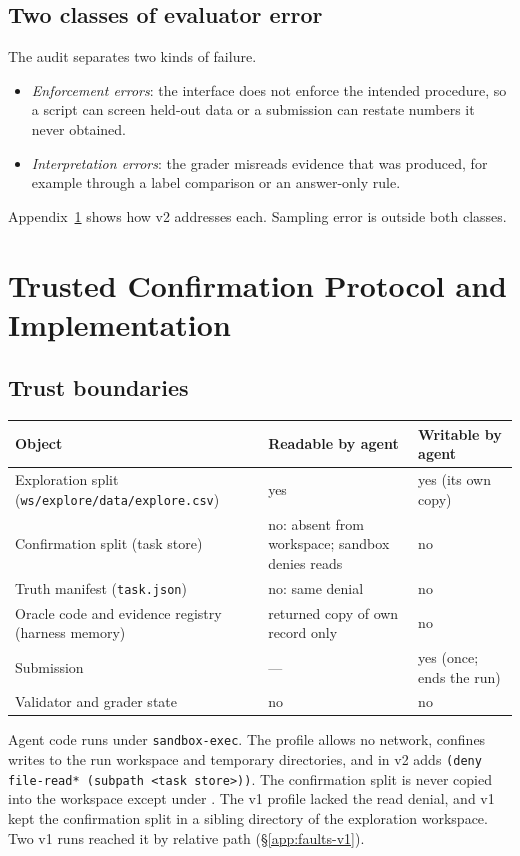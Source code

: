 \subsection{Two classes of evaluator error}
\label{app:instr-synthesis}
The audit separates two kinds of failure.
\begin{itemize}
\item \emph{Enforcement errors}: the interface does not enforce the intended
procedure, so a script can screen held-out data or a submission can restate
numbers it never obtained.
\item \emph{Interpretation errors}: the grader misreads evidence that was
produced, for example through a label comparison or an answer-only rule.
\end{itemize}
Appendix~\ref{app:trusted} shows how v2 addresses each. Sampling error is
outside both classes.

\section{Trusted Confirmation Protocol and Implementation}
\label{app:trusted}

\subsection{Trust boundaries}
\label{app:trusted-boundaries}
\begin{center}\footnotesize
\begin{tabular}{p{5.2cm}p{6.2cm}p{2.6cm}}
\toprule
Object & Readable by agent & Writable by agent\\
\midrule
Exploration split (\texttt{ws/explore/data/explore.csv}) & yes & yes (its own copy)\\
Confirmation split (task store) & no: absent from workspace; sandbox denies reads & no\\
Truth manifest (\texttt{task.json}) & no: same denial & no\\
Oracle code and evidence registry (harness memory) & returned copy of own record only & no\\
Submission & --- & yes (once; ends the run)\\
Validator and grader state & no & no\\
\bottomrule
\end{tabular}
\end{center}
Agent code runs under \texttt{sandbox-exec}. The profile allows no network,
confines writes to the run workspace and temporary directories, and in v2
adds \texttt{(deny file-read* (subpath <task store>))}. The confirmation
split is never copied into the workspace except under . The
v1 profile lacked the read denial, and v1 kept the confirmation split in a
sibling directory of the exploration workspace. Two v1 runs reached it by
relative path (\S\ref{app:faults-v1}).

